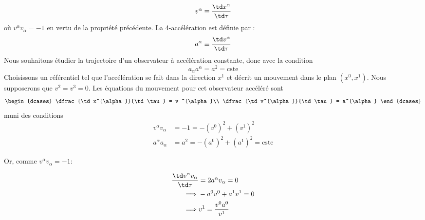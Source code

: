 {\begin{equation}
    v^\alpha \equiv \frac{\td x^\alpha}{\td \tau}
\end{equation}
où $v^{\alpha} v_{\alpha} = -1$ en vertu de la propriété précédente. La 4-accélération est définie par :
\begin{equation*}
    a^{\alpha} \equiv \frac{\td v^{\alpha}}{\td \tau}
\end{equation*}
Nous souhaitons étudier la trajectoire d'un observateur à accélération constante, donc avec la condition 
\begin{equation*}
    a_{\alpha}a^{\alpha} = a^{2} = \text{cste}
\end{equation*}
Choisissons un référentiel tel que l'accélération se fait dans la direction $x^{1}$ et décrit un mouvement dans le plan $(x^{0}, x^{1})$. Nous supposerons que $v^2 = v^3 = 0$. Les équations du mouvement pour cet observateur accéléré sont
\begin{align}
    \begin{dcases}
        \dfrac{\td x^{\alpha}}{\td \tau} = v ^{\alpha}\\
        \dfrac{\td v^{\alpha}}{\td \tau} = a^{\alpha}
    \end{dcases}
\end{align}
muni des conditions
\begin{align}
    v^{\alpha}v_{\alpha} & = -1 = -(v^{0})^2 + (v^{1})^2\\
    a^{\alpha}a_{\alpha} & = a^2 = -(a^{0})^2 + (a^{1})^2 = \mathrm{cste}
\end{align}

Or, comme $v^{\alpha}v_{\alpha} = -1$:

\begin{align}
    \frac{\td v^\alpha v_\alpha}{\td \tau} &= 2 a^{\alpha}v_{\alpha} = 0 \\
    \implies &-a^{0}v^{0} + a^{1}v^{1} = 0\\
    \label{eq:2.57}
    \implies &v^{1} = \frac{v^{0}a^{0}}{v^{1}}
\end{align}

}

